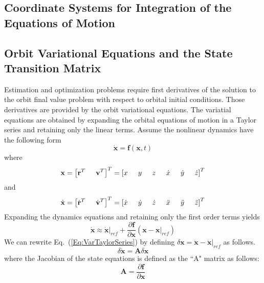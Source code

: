 \subsection{Coordinate Systems for Integration of the Equations of Motion}

\subsection{Orbit Variational Equations and the State Transition Matrix}

Estimation and optimization problems require first derivatives of the solution
to the orbit final value problem with respect to orbital initial conditions.  Those
derivatives are provided by the orbit variational equations.  The variatial equations are
obtained by expanding the orbital equations of motion in a Taylor series and retaining
only the linear terms.
%
Assume the nonlinear dynamics have the following form
%
\begin{equation}
    \dot{\mathbf{x}} = \mathbf{f}(\mathbf{x},t)
\end{equation}
%
where
%
\begin{equation}
    \mathbf{x} = \left[\mathbf{r}^T \hspace{.2 in} \mathbf{v}^T  \right]^T = \left[x \hspace{.2 in} y \hspace{.2 in} z \hspace{.2 in} \dot{x} \hspace{.2 in}
    \dot{y} \hspace{.2 in} \dot{z}  \right]^T
\end{equation}
%
and
%
\begin{equation}
    \dot{\mathbf{x}} = \left[\dot{\mathbf{r}}^T \hspace{.2 in} \dot{\mathbf{v}}^T  \right]^T = \left[\dot{x} \hspace{.2 in}
    \dot{y}
    \hspace{.2 in} \dot{z} \hspace{.2 in} \ddot{x} \hspace{.2 in}
    \ddot{y} \hspace{.2 in} \ddot{z}  \right]^T
\end{equation}
%
Expanding the dynamics equations and retaining only the first order terms yields
%
\begin{equation}
    \dot{\mathbf{x}} \approx  \dot{\mathbf{x}}|_{ref} + \frac{\partial \mathbf{f}}
    {\partial \mathbf{x}}\left( \mathbf{x} - \mathbf{x}|_{ref} \right)\label{Eq:VarTaylorSeries}
\end{equation}
%
%
We can rewrite Eq.~(\ref{Eq:VarTaylorSeries}) by defining $\delta \mathbf{x} = \dot{\mathbf{x}} - \dot{\mathbf{x}}|_{ref}$ as follows.
%
\begin{equation}
    \delta \dot{\mathbf{x}} = \mathbf{A}\delta \mathbf{x}\label{Eq:LinearizedOEM}
\end{equation}
%
where
%
the Jacobian of the state equations is defined as the ``A" matrix as follows:
%
\begin{equation}
    \mathbf{A} = \frac{\partial \mathbf{f}}{\partial \mathbf{x}}
\end{equation}

